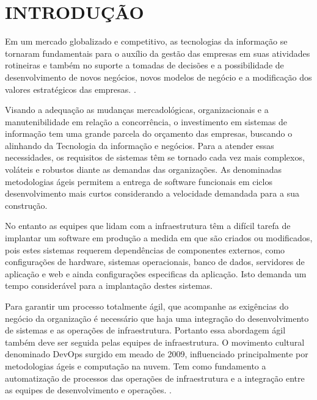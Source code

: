 \chapter{INTRODUÇÃO}

Em um mercado globalizado e competitivo, as tecnologias da informação se tornaram fundamentais para o auxílio da gestão das empresas em suas atividades rotineiras e também no suporte a tomadas de decisões e a possibilidade de desenvolvimento de novos negócios, novos modelos de negócio e a modificação dos valores estratégicos das empresas. \cite{audy}.

Visando a adequação as mudanças mercadológicas, organizacionais e a manutenibilidade em relação a concorrência, o investimento em sistemas de informação tem uma grande parcela do orçamento das empresas, buscando o alinhando da Tecnologia da informação e negócios. \cite{luftman}  
Para a atender essas necessidades, os requisitos de sistemas têm se tornado cada vez mais complexos, voláteis e robustos diante as demandas das organizações. 
As denominadas metodologias ágeis permitem a entrega de software funcionais em ciclos desenvolvimento mais curtos considerando a velocidade demandada para a sua construção. \cite{sbbrocco} 
          
No entanto as equipes que lidam com a infraestrutura têm a difícil tarefa de implantar um software em produção a medida em que são criados ou modificados, pois estes sistemas requerem dependências de componentes externos, como configurações de hardware, sistemas operacionais, banco de dados, servidores de aplicação e web e ainda configurações especificas da aplicação. Isto demanda um tempo considerável para a implantação destes sistemas.

Para garantir um processo totalmente ágil, que acompanhe as exigências do negócio da organização é necessário que haja uma integração do desenvolvimento de sistemas e as operações de infraestrutura. Portanto essa abordagem ágil também deve ser seguida pelas equipes de infraestrutura.
O movimento cultural denominado DevOps surgido em meado de 2009, influenciado principalmente por metodologias ágeis e computação na nuvem. Tem como fundamento a automatização de processos das operações de infraestrutura e a integração entre as equipes de desenvolvimento e operações. \cite{sato}.

